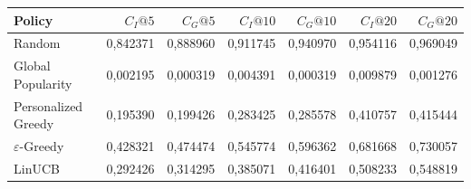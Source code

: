 \begin{tabular}{lrrrrrr}
\toprule
Policy & $C_I@5$ & $C_G@5$ & $C_I@10$ & $C_G@10$ & $C_I@20$ & $C_G@20$ \\
\midrule
Random & 0,842371 & 0,888960 & 0,911745 & 0,940970 & 0,954116 & 0,969049 \\
Global Popularity & 0,002195 & 0,000319 & 0,004391 & 0,000319 & 0,009879 & 0,001276 \\
Personalized Greedy & 0,195390 & 0,199426 & 0,283425 & 0,285578 & 0,410757 & 0,415444 \\
$\varepsilon$-Greedy & 0,428321 & 0,474474 & 0,545774 & 0,596362 & 0,681668 & 0,730057 \\
LinUCB & 0,292426 & 0,314295 & 0,385071 & 0,416401 & 0,508233 & 0,548819 \\
\bottomrule
\end{tabular}
